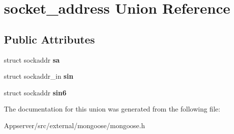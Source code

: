 \hypertarget{unionsocket__address}{}\section{socket\+\_\+address Union Reference}
\label{unionsocket__address}
\subsection*{Public Attributes}
\begin{DoxyCompactItemize}
\item 
struct sockaddr {\bfseries sa}\hypertarget{unionsocket__address_ab6a9b0bc545e839df7e06e5b6bff0891}{}\label{unionsocket__address_ab6a9b0bc545e839df7e06e5b6bff0891}

\item 
struct sockaddr\+\_\+in {\bfseries sin}\hypertarget{unionsocket__address_af540a7224ea459c48bc6ec1ca592e55d}{}\label{unionsocket__address_af540a7224ea459c48bc6ec1ca592e55d}

\item 
struct sockaddr {\bfseries sin6}\hypertarget{unionsocket__address_a923a2caba3cad046553b3632f7c2c571}{}\label{unionsocket__address_a923a2caba3cad046553b3632f7c2c571}

\end{DoxyCompactItemize}


The documentation for this union was generated from the following file\+:\begin{DoxyCompactItemize}
\item 
Appserver/src/external/mongoose/mongoose.\+h\end{DoxyCompactItemize}
